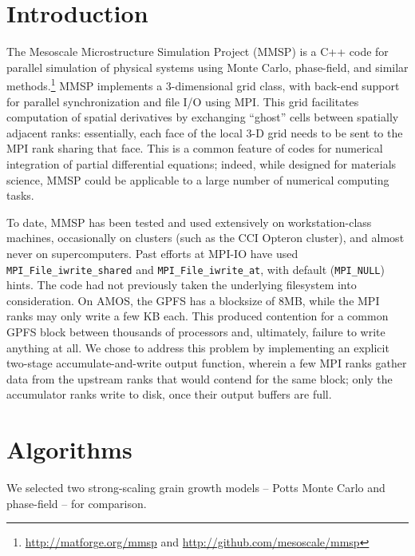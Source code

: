 \documentclass[11pt]{article}
\begin{document}
\begin{multicols*}{2}
\section{Introduction}
The Mesoscale Microstructure Simulation Project (MMSP) is a C++ code for parallel simulation of physical systems using Monte Carlo, phase-field, and similar methods.\footnote{\url{http://matforge.org/mmsp} and \url{http://github.com/mesoscale/mmsp}}
MMSP implements a 3-dimensional grid class, with back-end support for parallel synchronization and file I/O using MPI.
This grid facilitates computation of spatial derivatives by exchanging ``ghost'' cells between spatially adjacent ranks:
essentially, each face of the local 3-D grid needs to be sent to the MPI rank sharing that face.
This is a common feature of codes for numerical integration of partial differential equations;
indeed, while designed for materials science, MMSP could be applicable to a large number of numerical computing tasks.

To date, MMSP has been tested and used extensively on workstation-class machines, occasionally on clusters (such as the CCI Opteron cluster), and almost never on supercomputers.
Past efforts at MPI-IO have used \texttt{MPI\_File\_iwrite\_shared} and \texttt{MPI\_File\_iwrite\_at}, with default (\texttt{MPI\_NULL}) hints.
The code had not previously taken the underlying filesystem into consideration.
On AMOS, the GPFS has a blocksize of 8MB, while the MPI ranks may only write a few KB each.
This produced contention for a common GPFS block between thousands of processors and, ultimately, failure to write anything at all.
We chose to address this problem by implementing an explicit two-stage accumulate-and-write output function, wherein a few MPI ranks gather data from the upstream ranks that would contend for the same block;
only the accumulator ranks write to disk, once their output buffers are full.


\section{Algorithms\label{sec:algo}}
We selected two strong-scaling grain growth models -- Potts Monte Carlo and phase-field -- for comparison.


\end{multicols*}
\end{document}
